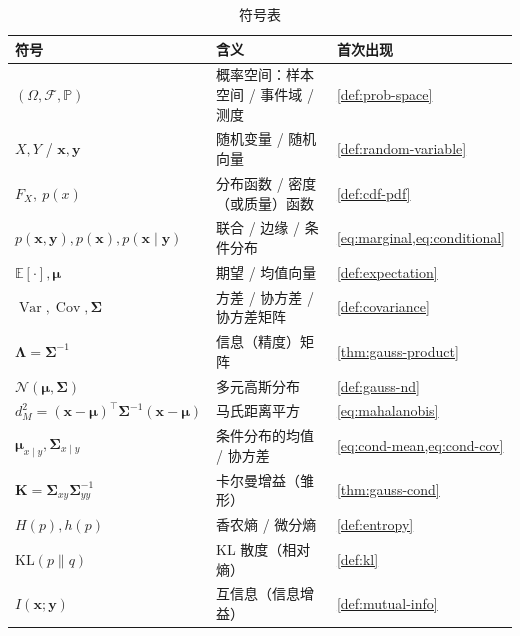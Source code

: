 \begin{table}[H]\centering\small
\caption{符号表}
\begin{tabular}{lll}
\toprule
符号 & 含义 & 首次出现 \\
\midrule
$(\Omega,\mathcal{F},\mathbb{P})$ & 概率空间：样本空间 / 事件域 / 测度 & \cref{def:prob-space} \\
$X,Y$ / $\mathbf{x},\mathbf{y}$ & 随机变量 / 随机向量 & \cref{def:random-variable} \\
$F_X,\ p(x)$ & 分布函数 / 密度（或质量）函数 & \cref{def:cdf-pdf} \\
$p(\mathbf{x},\mathbf{y}),p(\mathbf{x}),p(\mathbf{x}\mid\mathbf{y})$ & 联合 / 边缘 / 条件分布 & \cref{eq:marginal,eq:conditional} \\
$\mathbb{E}[\cdot],\boldsymbol{\mu}$ & 期望 / 均值向量 & \cref{def:expectation} \\
$\operatorname{Var},\operatorname{Cov},\boldsymbol{\Sigma}$ & 方差 / 协方差 / 协方差矩阵 & \cref{def:covariance} \\
$\boldsymbol{\Lambda}=\boldsymbol{\Sigma}^{-1}$ & 信息（精度）矩阵 & \cref{thm:gauss-product} \\
$\mathcal{N}(\boldsymbol{\mu},\boldsymbol{\Sigma})$ & 多元高斯分布 & \cref{def:gauss-nd} \\
$d_M^2=(\mathbf{x}-\boldsymbol{\mu})^\top\boldsymbol{\Sigma}^{-1}(\mathbf{x}-\boldsymbol{\mu})$ & 马氏距离平方 & \cref{eq:mahalanobis} \\
$\boldsymbol{\mu}_{x\mid y},\boldsymbol{\Sigma}_{x\mid y}$ & 条件分布的均值 / 协方差 & \cref{eq:cond-mean,eq:cond-cov} \\
$\mathbf{K}=\boldsymbol{\Sigma}_{xy}\boldsymbol{\Sigma}_{yy}^{-1}$ & 卡尔曼增益（雏形） & \cref{thm:gauss-cond} \\
$H(p),h(p)$ & 香农熵 / 微分熵 & \cref{def:entropy} \\
$\mathrm{KL}(p\|q)$ & KL 散度（相对熵） & \cref{def:kl} \\
$I(\mathbf{x};\mathbf{y})$ & 互信息（信息增益） & \cref{def:mutual-info} \\
\bottomrule
\end{tabular}
\end{table}

